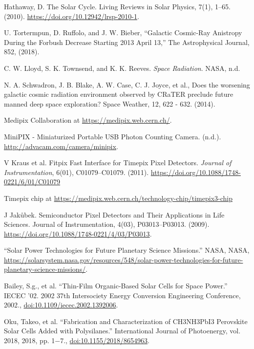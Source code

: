 \begin{thebibliography}{9}
  Hathaway, D. The Solar Cycle. Living Reviews in Solar Physics, 7(1), 1–65. (2010). \url{https://doi.org/10.12942/lrsp-2010-1}.

  U. Tortermpun, D. Ruffolo, and J. W. Bieber, “Galactic Cosmic-Ray Anistropy During the Forbush Decrease Starting 2013 April 13,” The Astrophysical Journal, 852, (2018).

  C. W. Lloyd, S. K. Townsend, and K. K. Reeves. \textit{Space Radiation}. NASA, n.d.

  N. A. Schwadron, J. B. Blake, A. W. Case, C. J. Joyce, et al., Does the worsening galactic cosmic radiation environment observed by CRaTER preclude future manned deep space exploration? Space Weather, 12, 622 - 632. (2014).

  Medipix Collaboration at \url{https://medipix.web.cern.ch/}.

  MiniPIX - Miniaturized Portable USB Photon Counting Camera. (n.d.). \url{http://advacam.com/camera/minipix}.

  V Kraus et al. Fitpix Fast Interface for Timepix Pixel Detectors. \textit{Journal of Instrumentation}, 6(01), C01079–C01079. (2011). \url{https://doi.org/10.1088/1748-0221/6/01/C01079}

  Timepix chip at \url{https://medipix.web.cern.ch/technology-chip/timepix3-chip}

  J Jakůbek. Semiconductor Pixel Detectors and Their Applications in Life Sciences. Journal of Instrumentation, 4(03), P03013–P03013. (2009). \url{https://doi.org/10.1088/1748-0221/4/03/P03013}.

  “Solar Power Technologies for Future Planetary Science Missions.” NASA, NASA, \url{https://solarsystem.nasa.gov/resources/548/solar-power-technologies-for-future-planetary-science-missions/}.

  Bailey, S.g., et al. “Thin-Film Organic-Based Solar Cells for Space Power.” IECEC '02. 2002 37th Intersociety Energy Conversion Engineering Conference, 2002., \url{doi:10.1109/iecec.2002.1392006}.
  
  Oku, Takeo, et al. “Fabrication and Characterization of CH3NH3PbI3 Perovskite Solar Cells Added with Polysilanes.” International Journal of Photoenergy, vol. 2018, 2018, pp. 1$-$7., \url{doi:10.1155/2018/8654963}.
  

\end{thebibliography}
